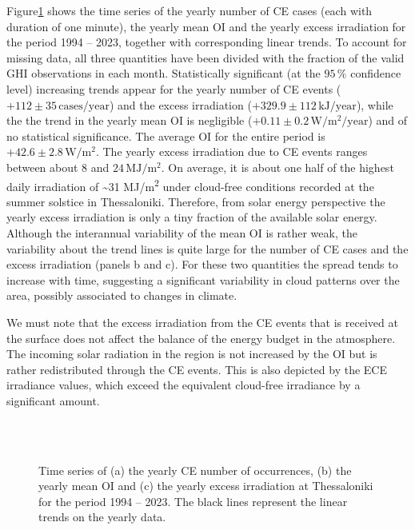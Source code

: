 \documentclass[preprint, 5p,
authoryear]{elsarticle} %
\begin{document}
Figure\nobreakspace{}\ref{fig:P-energy} shows the time series of the
yearly number of CE cases (each with duration of one minute), the yearly
mean OI and the yearly excess irradiation for the period 1994 -- 2023,
together with corresponding linear trends. To account for missing data,
all three quantities have been divided with the fraction of the valid
GHI observations in each month. Statistically significant (at the
\(95\,\%\) confidence level) increasing trends appear for the yearly
number of CE events (\(+112\pm 35\,\text{cases}/\text{year}\)) and the
excess irradiation (\(+329.9 \pm 112\,\text{kJ}/\text{year}\)), while
the the trend in the yearly mean OI is negligible
(\(+0.11\pm 0.2\,\text{W}/\text{m}^2/\text{year}\)) and of no
statistical significance. The average OI for the entire period is
\(+42.6\pm 2.8\,\text{W}/\text{m}^2\). The yearly excess irradiation due
to CE events ranges between about \(8\) and
\(24\,\text{MJ}/\text{m}^2\). On average, it is about one half of the
highest daily irradiation of \textasciitilde31 MJ/m\textsuperscript{2}
under cloud-free conditions recorded at the summer solstice in
Thessaloniki. Therefore, from solar energy perspective the yearly excess
irradiation is only a tiny fraction of the available solar energy.
Although the interannual variability of the mean OI is rather weak, the
variability about the trend lines is quite large for the number of CE
cases and the excess irradiation (panels b and c). For these two
quantities the spread tends to increase with time, suggesting a
significant variability in cloud patterns over the area, possibly
associated to changes in climate.

We must note that the excess irradiation from the CE events that is
received at the surface does not affect the balance of the energy budget
in the atmosphere. The incoming solar radiation in the region is not
increased by the OI but is rather redistributed through the CE events.
This is also depicted by the ECE irradiance values, which exceed the
equivalent cloud-free irradiance by a significant amount.

\begin{figure}%
        {\centering
            \\
            \\
        }
    \caption{Time series of (a) the yearly CE number of occurrences, (b) the yearly mean OI and (c) the yearly excess irradiation at Thessaloniki for the period 1994 – 2023. The black lines represent the linear trends on the yearly data.}\label{fig:P-energy}
\end{figure}
\end{document}
